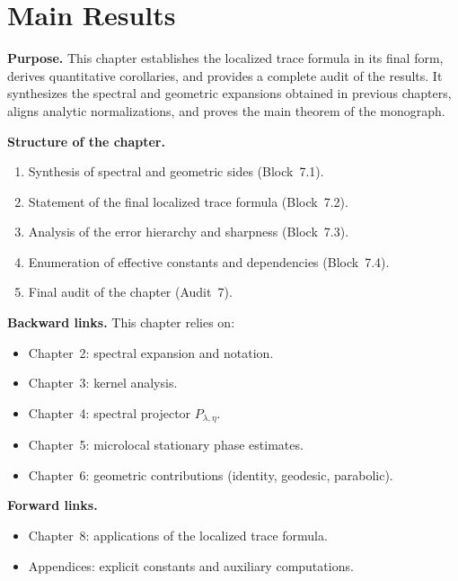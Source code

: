 
\chapter{Main Results}

\noindent\textbf{Purpose.}
This chapter establishes the localized trace formula in its final form,
derives quantitative corollaries, and provides a complete audit of the results.
It synthesizes the spectral and geometric expansions obtained in previous
chapters, aligns analytic normalizations, and proves the main theorem of the
monograph.

\medskip

\noindent\textbf{Structure of the chapter.}
\begin{enumerate}[label=\textbf{7.\arabic*}]
  \item Synthesis of spectral and geometric sides (Block~7.1).
  \item Statement of the final localized trace formula (Block~7.2).
  \item Analysis of the error hierarchy and sharpness (Block~7.3).
  \item Enumeration of effective constants and dependencies (Block~7.4).
  \item Final audit of the chapter (Audit~7).
\end{enumerate}

\medskip

\noindent\textbf{Backward links.}
This chapter relies on:
\begin{itemize}
  \item Chapter~2: spectral expansion and notation.
  \item Chapter~3: kernel analysis.
  \item Chapter~4: spectral projector $P_{\lambda,\eta}$.
  \item Chapter~5: microlocal stationary phase estimates.
  \item Chapter~6: geometric contributions (identity, geodesic, parabolic).
\end{itemize}

\noindent\textbf{Forward links.}
\begin{itemize}
  \item Chapter~8: applications of the localized trace formula.
  \item Appendices: explicit constants and auxiliary computations.
\end{itemize}

